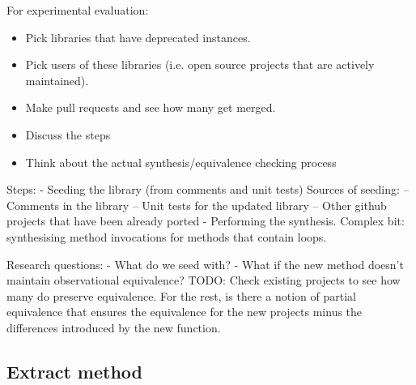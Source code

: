 \documentclass[runningheads,a4paper]{llncs}
\begin{document}
For experimental evaluation:
\begin{itemize}
\item Pick libraries that have deprecated instances.
\item Pick users of these libraries (i.e. open source projects that are actively maintained).
\item Make pull requests and see how many get merged.
\end{itemize}  

\begin{itemize}
\item Discuss the steps
  \item Think about the actual synthesis/equivalence checking process
\end{itemize}

Steps:
- Seeding the library (from comments and unit tests)
Sources of seeding:
-- Comments in the library
-- Unit tests for the updated library
-- Other github projects that have been already ported
- Performing the synthesis. Complex bit: synthesising method invocations for methods that contain loops.

Research questions:
- What do we seed with?
- What if the new method doesn't maintain observational equivalence?
TODO: Check existing projects to see how many do preserve equivalence.
For the rest, is there a notion of partial equivalence that ensures the equivalence
for the new projects minus the differences introduced by the new function.



\subsection{Extract method}
\end{document}
